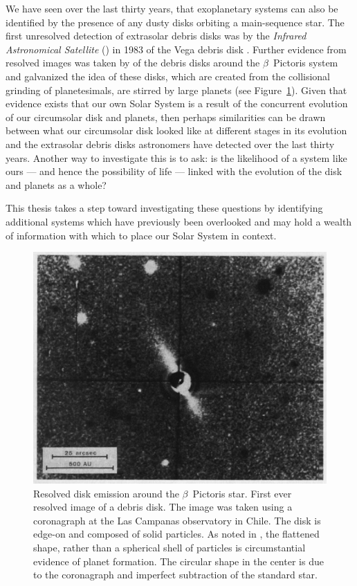     We have seen over the last thirty years, that exoplanetary systems can also be identified by the presence of any dusty disks orbiting a main-sequence star. The first unresolved detection of extrasolar debris disks was by the \textit{Infrared Astronomical Satellite} (\iras) in 1983 of the Vega debris disk \citep{Aumann1984}. Further evidence from resolved images was taken by \citet{Smith1984} of the debris disks around the $\beta$~Pictoris system and galvanized the idea of these disks, which are created from the collisional grinding of planetesimals, are stirred by large planets  (see Figure~\ref{fig:smith_terrile_betapic}). Given that evidence exists that our own Solar System is a result of the concurrent evolution of our circumsolar disk and planets, then perhaps similarities can be drawn between what our circumsolar disk looked like at different stages in its evolution and the extrasolar debris disks astronomers have detected over the last thirty years. Another way to investigate this is to ask: is the likelihood of a system like ours --- and hence the possibility of life --- linked with the evolution of the disk and planets as a whole?
    
    This thesis takes a step toward investigating these questions by identifying additional systems which have previously been overlooked and may hold a wealth of information with which to place our Solar System in context. 
    
    \begin{figure}
    \centering
    \includegraphics[width=.6\textwidth]{Ch1/betapic_SmithTerrile_84} 
    \caption[First Resolved Debris Disk: $\beta$~Pictoris]{Resolved disk emission around the $\beta$~Pictoris star. First ever resolved image of a debris disk. The image was taken using a coronagraph at the Las Campanas observatory in Chile. The disk is edge-on and composed of solid particles. As noted in \citet{Smith1984}, the flattened shape, rather than a spherical shell of particles is circumstantial evidence of planet formation. The circular shape in the center is due to the coronagraph and imperfect subtraction of the standard star.}
    \label{fig:smith_terrile_betapic}
    \end{figure}
    
